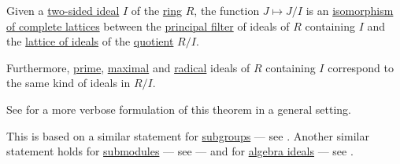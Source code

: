 \begin{theorem}\label{thm:lattice_theorem_for_ring_ideals}
  Given a \hyperref[def:semiring_ideal]{two-sided ideal} \( I \) of the \hyperref[def:ring]{ring} \( R \), the function \( J \mapsto J / I \) is an \hyperref[def:lattice/homomorphism]{isomorphism of complete lattices} between the \hyperref[def:lattice_ideal/principal]{principal filter} of ideals of \( R \) containing \( I \) and the \hyperref[thm:semiring_of_ideals/lattice]{lattice of ideals} of the \hyperref[def:ring/quotient]{quotient} \( R / I \).

  Furthermore, \hyperref[def:semiring_ideal/prime]{prime}, \hyperref[def:semiring_ideal/maximal]{maximal} and \hyperref[def:radical_ideal]{radical} ideals of \( R \) containing \( I \) correspond to the same kind of ideals in \( R / I \).
\end{theorem}
\begin{comments}
  \item See  for a more verbose formulation of this theorem in a general setting.
  \item This is based on a similar statement for \hyperref[def:group/subobject]{subgroups} --- see . Another similar statement holds for \hyperref[def:module/subobject]{submodules} --- see  --- and for \hyperref[def:algebra_over_ring/ideal]{algebra ideals} --- see .
\end{comments}
